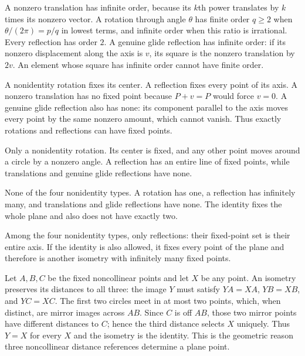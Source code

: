 A nonzero translation has infinite order, because its $k$th power translates by $k$ times its nonzero vector. A rotation through angle $\theta$ has finite order $q\ge2$ when $\theta/(2\pi)=p/q$ in lowest terms, and infinite order when this ratio is irrational. Every reflection has order $2$. A genuine glide reflection has infinite order: if its nonzero displacement along the axis is $v$, its square is the nonzero translation by $2v$. An element whose square has infinite order cannot have finite order.

A nonidentity rotation fixes its center. A reflection fixes every point of its axis. A nonzero translation has no fixed point because $P+v=P$ would force $v=0$. A genuine glide reflection also has none: its component parallel to the axis moves every point by the same nonzero amount, which cannot vanish. Thus exactly rotations and reflections can have fixed points.

Only a nonidentity rotation. Its center is fixed, and any other point moves around a circle by a nonzero angle. A reflection has an entire line of fixed points, while translations and genuine glide reflections have none.

None of the four nonidentity types. A rotation has one, a reflection has infinitely many, and translations and glide reflections have none. The identity fixes the whole plane and also does not have exactly two.

Among the four nonidentity types, only reflections: their fixed-point set is their entire axis. If the identity is also allowed, it fixes every point of the plane and therefore is another isometry with infinitely many fixed points.

Let $A,B,C$ be the fixed noncollinear points and let $X$ be any point. An isometry preserves its distances to all three: the image $Y$ must satisfy $YA=XA$, $YB=XB$, and $YC=XC$. The first two circles meet in at most two points, which, when distinct, are mirror images across $AB$. Since $C$ is off $AB$, those two mirror points have different distances to $C$; hence the third distance selects $X$ uniquely. Thus $Y=X$ for every $X$ and the isometry is the identity. This is the geometric reason three noncollinear distance references determine a plane point.

